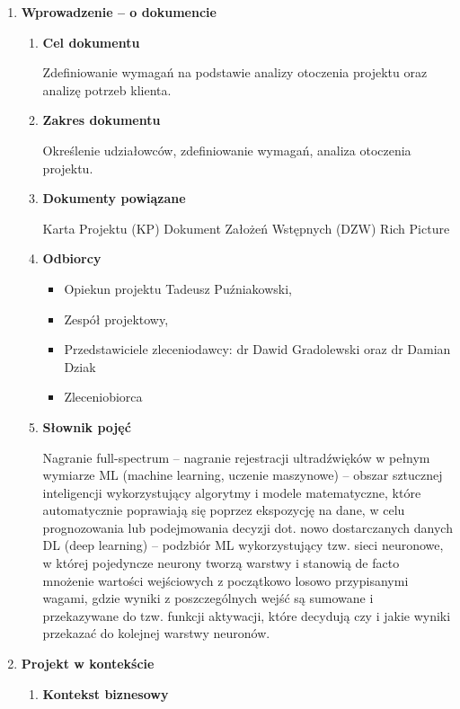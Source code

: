 \documentclass{sprz}
\begin{document}
\begin{enumerate}[label=\textbf{\arabic*}.]
  \item \textbf{Wprowadzenie – o dokumencie}
    \begin{enumerate}[font=\bfseries]
      \item \textbf{Cel dokumentu}
      
        Zdefiniowanie wymagań na podstawie analizy otoczenia projektu oraz analizę potrzeb klienta.

      \item \textbf{Zakres dokumentu}
      
        Określenie udziałowców, zdefiniowanie wymagań, analiza otoczenia projektu.

      \item \textbf{Dokumenty powiązane}
      
        Karta Projektu (KP)
        Dokument Założeń Wstępnych (DZW)
        Rich Picture

      \item \textbf{Odbiorcy}
      
        \begin{itemize}
          \item Opiekun projektu Tadeusz Puźniakowski,
          \item Zespół projektowy,
          \item Przedstawiciele zleceniodawcy: dr Dawid Gradolewski oraz dr Damian Dziak
          \item Zleceniobiorca
        \end{itemize}  

      \item \textbf{Słownik pojęć}
      
        Nagranie full-spectrum – nagranie rejestracji ultradźwięków w pełnym wymiarze
        ML (machine learning, uczenie maszynowe) – obszar sztucznej inteligencji wykorzystujący algorytmy i modele matematyczne, które automatycznie poprawiają się poprzez ekspozycję na dane, w celu prognozowania lub podejmowania decyzji dot. nowo dostarczanych danych 
        DL (deep learning) – podzbiór ML wykorzystujący tzw. sieci neuronowe, w której pojedyncze neurony tworzą warstwy i stanowią de facto mnożenie wartości wejściowych z początkowo losowo przypisanymi wagami, gdzie wyniki z poszczególnych wejść są sumowane i przekazywane do tzw. funkcji aktywacji, które decydują czy i jakie wyniki przekazać do kolejnej warstwy neuronów.      

    \end{enumerate}
  \item \textbf{Projekt w kontekście}
    \begin{enumerate}[font=\bfseries]
      \item \textbf{Kontekst biznesowy}
      

\end{enumerate}
\end{enumerate}
\end{document}
